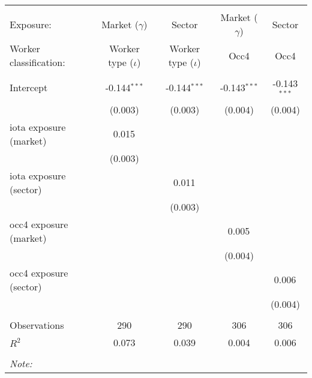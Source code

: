 \begin{tabular}{@{\extracolsep{5pt}}lcccc}
\\[-1.8ex]\hline
\hline \\[-1.8ex]
\hline \\[-1.8ex]
 Exposure: & Market ($\gamma$) & Sector & Market ($\gamma$) & Sector \\
 Worker classification: & Worker type ($\iota$) & Worker type ($\iota$) & Occ4 & Occ4 \\
 \hline &  &  &  &  \\
 Intercept & -0.144$^{***}$ & -0.144$^{***}$ & -0.143$^{***}$ & -0.143$^{***}$ \\
  & (0.003) & (0.003) & (0.004) & (0.004) \\
 iota exposure (market) & 0.015$^{}$ & & & \\
  & (0.003) & & & \\
 iota exposure (sector) & & 0.011$^{}$ & & \\
  & & (0.003) & & \\
 occ4 exposure (market) & & & 0.005$^{}$ & \\
  & & & (0.004) & \\
 occ4 exposure (sector) & & & & 0.006$^{}$ \\
  & & & & (0.004) \\
\hline \\[-1.8ex]
 Observations & 290 & 290 & 306 & 306 \\
 $R^2$ & 0.073 & 0.039 & 0.004 & 0.006 \\
\hline
\hline \\[-1.8ex]
\textit{Note:}\end{tabular}